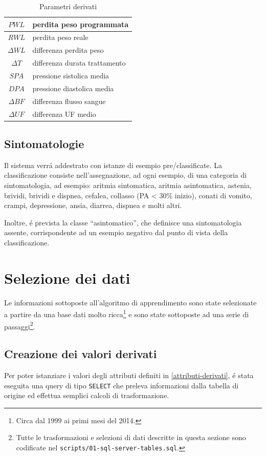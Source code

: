 \documentclass[preprint]{acm_proc_article-sp}
\begin{document}
\begin{table}[h]
\centering
\begin{tabular}{|c|l|} \hline
$PWL$ & perdita peso programmata\\ \hline
$RWL$ & perdita peso reale\\ \hline
$\Delta WL$ & differenza perdita peso\\ \hline
$\Delta T$ & differenza durata trattamento\\ \hline
$SPA$ & pressione sistolica media \\ \hline
$DPA$ & pressione diastolica media \\ \hline
$\Delta BF$ & differenza flusso sangue \\ \hline
$\Delta UF$ & differenza UF medio \\
\hline\end{tabular}
\caption{Parametri derivati}
\label{table:parametri-derivati}
\end{table}

\subsection{Sintomatologie}
Il sistema verr\'a addestrato con istanze di esempio pre\-/classificate. La classificazione consiste nell'assegnazione, ad ogni esempio, di una categoria di sintomatologia, ad esempio: aritmia sintomatica, aritmia asintomatica, astenia, brividi, brividi e dispnea, cefalea, collasso (PA < 30\% inizio), conati di vomito, crampi, depressione, ansia, diarrea, dispnea e molti altri.

Inoltre, \'e prevista la classe ``asintomatico'', che definisce una sintomatologia assente, corrispondente ad un esempio negativo dal punto di vista della classificazione.

\section{Selezione dei dati}
Le informazioni sottoposte all'algoritmo di apprendimento sono state selezionate a partire da una base dati molto ricca\footnote{Circa dal 1999 ai primi mesi del 2014.} e sono state sottoposte ad una serie di passaggi\footnote{Tutte le trasformazioni e selezioni di dati descritte in questa sezione sono codificate nel \texttt{scripts/01-sql-server-tables.sql}.}.

\subsection{Creazione dei valori derivati}
Per poter istanziare i valori degli attributi definiti in \ref{attributi-derivati}, \'e stata eseguita una query di tipo \texttt{SELECT} che preleva informazioni dalla tabella di origine ed effettua semplici calcoli di trasformazione.
\end{document}
